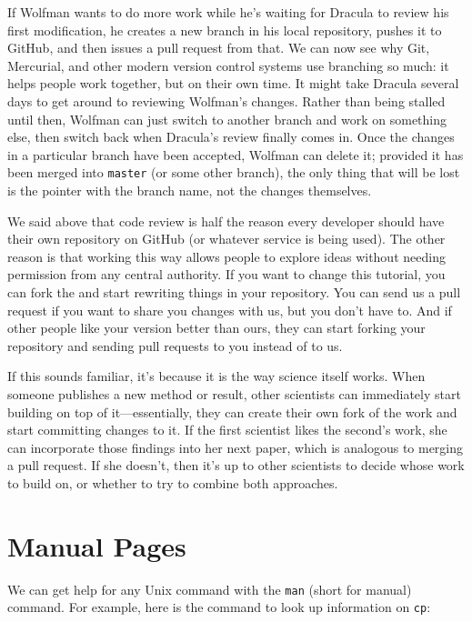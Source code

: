 \documentclass{book}
\begin{document}
If Wolfman wants to do more work while he's waiting for Dracula to
review his first modification, he creates a new branch in his local
repository, pushes it to GitHub, and then issues a pull request from
that. We can now see why Git, Mercurial, and other modern version
control systems use branching so much: it helps people work together,
but on their own time. It might take Dracula several days to get around
to reviewing Wolfman's changes. Rather than being stalled until then,
Wolfman can just switch to another branch and work on something else,
then switch back when Dracula's review finally comes in. Once the
changes in a particular branch have been accepted, Wolfman can delete
it; provided it has been merged into \texttt{master} (or some other
branch), the only thing that will be lost is the pointer with the branch
name, not the changes themselves.

We said above that code review is half the reason every developer should
have their own repository on GitHub (or whatever service is being used).
The other reason is that working this way allows people to explore ideas
without needing permission from any central authority. If you want to
change this tutorial, you can fork the
 and start rewriting things in your repository. You can send
us a pull request if you want to share you changes with us, but you
don't have to. And if other people like your version better than ours,
they can start forking your repository and sending pull requests to you
instead of to us.

If this sounds familiar, it's because it is the way science itself
works. When someone publishes a new method or result, other scientists
can immediately start building on top of it---essentially, they can
create their own fork of the work and start committing changes to it. If
the first scientist likes the second's work, she can incorporate those
findings into her next paper, which is analogous to merging a pull
request. If she doesn't, then it's up to other scientists to decide
whose work to build on, or whether to try to combine both approaches.

\section{Manual Pages}

We can get help for any Unix command with the \texttt{man} (short for
manual) command. For example, here is the command to look up information
on \texttt{cp}:
\end{document}
